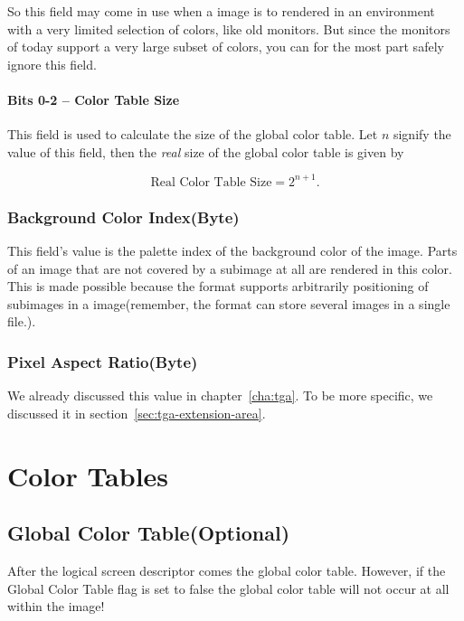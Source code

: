 So this field may come in use when a \gif image is to rendered in an
environment with a very limited selection of colors, like old
monitors.  But since the monitors of today support a very large subset
of colors, you can for the most part safely ignore this field.

\paragraph{Bits 0-2 -- Color Table Size}

This field is used to calculate the size of the global color table.
Let $n$ signify the value of this field, then the \textit{real} size
of the global color table is given by

\begin{equation}
  \label{eq:calc-global-color-table-size}
  \text{Real Color Table Size} = 2^{n + 1}.
\end{equation}

\subsubsection{Background Color Index(Byte)}

This field's value is the palette index of the background color of the
image. Parts of an image that are not covered by a subimage at all are
rendered in this color. This is made possible because the \gif format
supports arbitrarily positioning of subimages in a \gif image(remember,
the \gif format can store several images in a single file.).

\subsubsection{Pixel Aspect Ratio(Byte)}

We already discussed this value in chapter~\ref{cha:tga}. To be more
specific, we discussed it in section~\ref{sec:tga-extension-area}.

\section{Color Tables}

\subsection{Global Color Table(Optional)}

After the logical screen descriptor comes the global color
table. However, if the Global Color Table flag is set to false the
global color table will not occur at all within the image!

